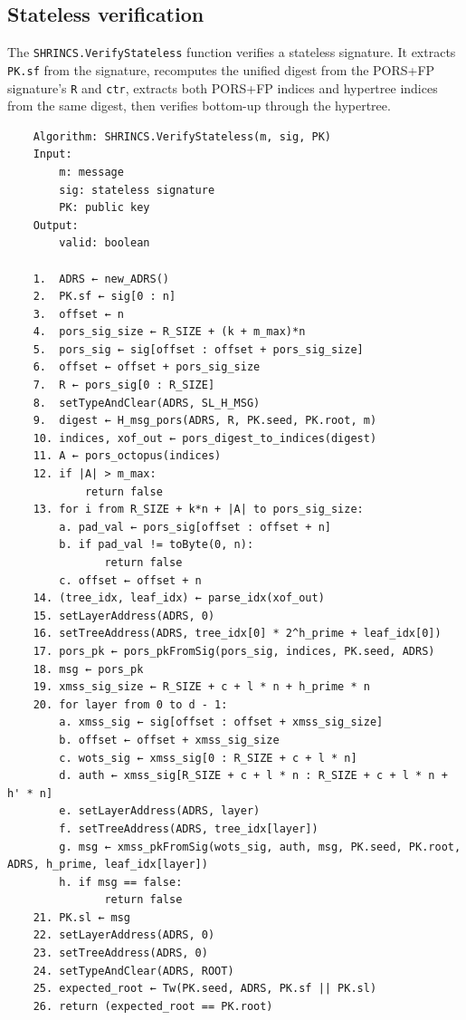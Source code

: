 \subsection{Stateless verification}
The \texttt{SHRINCS.VerifyStateless} function verifies a stateless signature. It extracts \texttt{PK.sf} from the signature, recomputes the unified digest from the PORS+FP signature's \texttt{R} and \texttt{ctr}, extracts both PORS+FP indices and hypertree indices from the same digest, then verifies bottom-up through the hypertree.
\begin{verbatim}
    Algorithm: SHRINCS.VerifyStateless(m, sig, PK)
    Input:
        m: message
        sig: stateless signature
        PK: public key
    Output:
        valid: boolean

    1.  ADRS ← new_ADRS()
    2.  PK.sf ← sig[0 : n]
    3.  offset ← n
    4.  pors_sig_size ← R_SIZE + (k + m_max)*n
    5.  pors_sig ← sig[offset : offset + pors_sig_size]
    6.  offset ← offset + pors_sig_size
    7.  R ← pors_sig[0 : R_SIZE]
    8.  setTypeAndClear(ADRS, SL_H_MSG)
    9.  digest ← H_msg_pors(ADRS, R, PK.seed, PK.root, m)
    10. indices, xof_out ← pors_digest_to_indices(digest)
    11. A ← pors_octopus(indices)
    12. if |A| > m_max:
            return false
    13. for i from R_SIZE + k*n + |A| to pors_sig_size:
        a. pad_val ← pors_sig[offset : offset + n]
        b. if pad_val != toByte(0, n):
               return false
        c. offset ← offset + n
    14. (tree_idx, leaf_idx) ← parse_idx(xof_out)
    15. setLayerAddress(ADRS, 0)
    16. setTreeAddress(ADRS, tree_idx[0] * 2^h_prime + leaf_idx[0])
    17. pors_pk ← pors_pkFromSig(pors_sig, indices, PK.seed, ADRS)
    18. msg ← pors_pk
    19. xmss_sig_size ← R_SIZE + c + l * n + h_prime * n
    20. for layer from 0 to d - 1:
        a. xmss_sig ← sig[offset : offset + xmss_sig_size]
        b. offset ← offset + xmss_sig_size
        c. wots_sig ← xmss_sig[0 : R_SIZE + c + l * n]
        d. auth ← xmss_sig[R_SIZE + c + l * n : R_SIZE + c + l * n + h' * n]
        e. setLayerAddress(ADRS, layer)
        f. setTreeAddress(ADRS, tree_idx[layer])
        g. msg ← xmss_pkFromSig(wots_sig, auth, msg, PK.seed, PK.root, ADRS, h_prime, leaf_idx[layer])
        h. if msg == false:
               return false
    21. PK.sl ← msg
    22. setLayerAddress(ADRS, 0)
    23. setTreeAddress(ADRS, 0)
    24. setTypeAndClear(ADRS, ROOT)
    25. expected_root ← Tw(PK.seed, ADRS, PK.sf || PK.sl)
    26. return (expected_root == PK.root)
\end{verbatim}

